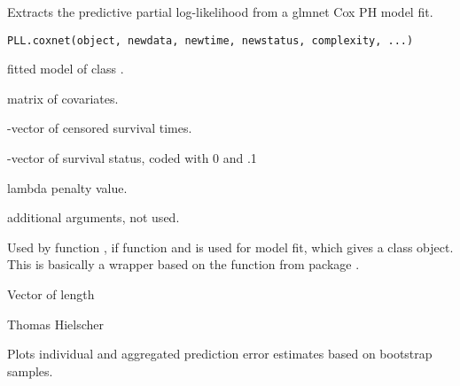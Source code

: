 \documentclass[letterpaper]{book}
\begin{document}
%
\begin{Description}\relax
Extracts the predictive partial log-likelihood from a glmnet Cox PH model fit.
\end{Description}
%
\begin{Usage}
\begin{verbatim}
PLL.coxnet(object, newdata, newtime, newstatus, complexity, ...)
\end{verbatim}
\end{Usage}
%
\begin{Arguments}
\begin{ldescription}
\item[\code{object}] fitted model of class .
\item[\code{newdata}]  matrix of covariates.
\item[\code{newtime}] -vector of censored survival times.
\item[\code{newstatus}] -vector of survival status, coded with 0 and .1
\item[\code{complexity}] lambda penalty value.
\item[\code{...}] additional arguments, not used.
\end{ldescription}
\end{Arguments}
%
\begin{Details}\relax
Used by function , if function  and  is used for model fit, which gives a class  object.
This is basically a wrapper based on the  function from package .
\end{Details}
%
\begin{Value}
Vector of length 
\end{Value}
%
\begin{Author}\relax
Thomas Hielscher \bsl{}
\end{Author}
%
\begin{Description}\relax
Plots individual and aggregated prediction error estimates based on bootstrap samples.
\end{Description}
\end{document}
